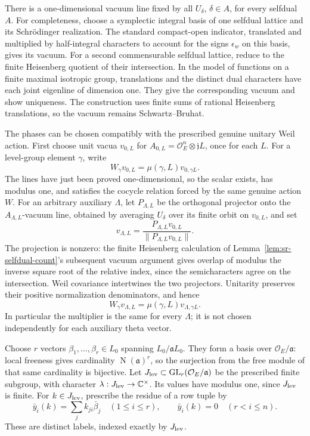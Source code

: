 There is a one-dimensional vacuum line fixed by all
\(U_\delta\), \(\delta\in A\), for every selfdual \(A\).
For completeness, choose a symplectic integral basis of one
selfdual lattice and its Schr\"odinger realization.
The standard compact-open indicator, translated and multiplied
by half-integral characters to account for the signs
\(\epsilon_w\) on this basis, gives its vacuum.
For a second commensurable selfdual lattice, reduce to the
finite Heisenberg quotient of their intersection.
In the model of functions on a finite maximal isotropic group,
translations and the distinct dual characters have each joint
eigenline of dimension one.
They give the corresponding vacuum and show uniqueness.
The construction uses finite sums of rational Heisenberg
translations, so the vacuum remains Schwartz--Bruhat.

The phases can be chosen compatibly with the prescribed genuine
unitary Weil action.  First choose unit vacua \(v_{0,L}\) for
\(A_{0,L}=\mathcal O_E^n\otimes\mathfrak jL\), once for each \(L\).
For a level-group element \(\gamma\), write
\[
 W_\gamma v_{0,L}=\mu(\gamma,L)v_{0,\gamma L}.
\]
The lines have just been proved one-dimensional, so the scalar
exists, has modulus one, and satisfies the cocycle relation
forced by the same genuine action \(W\).
For an arbitrary auxiliary \(\Lambda\), let \(P_{\Lambda,L}\)
be the orthogonal projector onto the
\(A_{\Lambda,L}\)-vacuum line, obtained by averaging
\(U_\delta\) over its finite orbit on \(v_{0,L}\), and set
\[
 v_{\Lambda,L}=
  \frac{P_{\Lambda,L}v_{0,L}}
       {\|P_{\Lambda,L}v_{0,L}\|}.
\]
The projection is nonzero: the finite Heisenberg calculation
of Lemma~\ref{lem:sr-selfdual-count}'s subsequent vacuum argument
gives overlap of modulus the inverse square root of the
relative index, since the semicharacters agree on the
intersection.
Weil covariance intertwines the two projectors.
Unitarity preserves their positive normalization denominators,
and hence
\begin{equation}\label{eq:sr-common-vacuum-multiplier}
 W_\gamma v_{\Lambda,L}
       =\mu(\gamma,L)v_{\Lambda,\gamma L}.
\end{equation}
In particular the multiplier is the same for every \(\Lambda\);
it is not chosen independently for each auxiliary theta vector.

Choose \(r\) vectors \(\beta_1,\ldots,\beta_r\in L_0\)
spanning \(L_0/\mathfrak aL_0\).
They form a basis over \(\mathcal O_E/\mathfrak a\):
local freeness gives cardinality
\(\operatorname N(\mathfrak a)^r\), so the surjection from the
free module of that same cardinality is bijective.
Let
\(J_{\rm lev}\subset\operatorname{GL}_r(\mathcal O_E/\mathfrak a)\)
be the prescribed finite subgroup, with character
\(\lambda:J_{\rm lev}\to\mathbb C^\times\).
Its values have modulus one, since \(J_{\rm lev}\) is finite.
For \(k\in J_{\rm lev}\), prescribe the residue of a row tuple by
\[
 \bar y_i(k)=\sum_j k_{ji}\bar\beta_j\quad(1\le i\le r),
 \qquad \bar y_i(k)=0\quad(r<i\le n).
\]
These are distinct labels, indexed exactly by \(J_{\rm lev}\).

